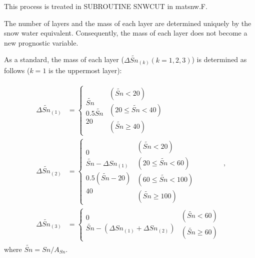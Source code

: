 This process is treated in SUBROUTINE SNWCUT in matsnw.F.

The number of layers and the mass of each layer are determined uniquely by the snow water equivalent. Consequently, the mass of each layer does not become a new prognostic variable.

As a standard, the mass of each layer (\(\Delta{\widetilde{Sn}}_{(k)} (k=1,2,3)\)) is determined as follows (\(k=1\) is the uppermost layer):

\begin{eqnarray}
\begin{aligned}
\Delta \widetilde{Sn}_{(1)} &= \left\{
\begin{array}{ll}
 \widetilde{Sn} \\
 0.5\widetilde{Sn}  \\
 20
\end{array}
\begin{array}{ll}
 (\widetilde{Sn} < 20) \\
 (20 \leq \widetilde{Sn} < 40) \\
 (\widetilde{Sn} \geq 40)
\end{array}
\right. \\
\Delta \widetilde{Sn}_{(2)} &= \left\{
\begin{array}{ll}
 0 \\
 \widetilde{Sn} - \Delta Sn_{(1)} \\
 0.5(\widetilde{Sn} - 20) \\
 40
\end{array}
\begin{array}{ll}
 (\widetilde{Sn} < 20) \\
 (20 \leq \widetilde{Sn} < 60) \\
 (60 \leq \widetilde{Sn} < 100) \\
 (\widetilde{Sn} \geq 100)
\end{array}
\right. \\
\Delta \widetilde{Sn}_{(3)} &= \left\{
\begin{array}{ll}
 0 \\
 \widetilde{Sn} - (\Delta Sn_{(1)} + \Delta Sn_{(2)})
\end{array}
\begin{array}{ll}
 (\widetilde{Sn} < 60) \\
 (\widetilde{Sn} \geq 60)
\end{array}
\right.
\end{aligned}, \label{8-7}
\end{eqnarray} where \(\widetilde{Sn} =  Sn / A_{Sn}.\)

